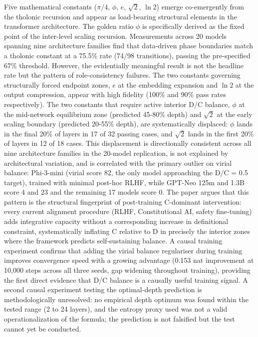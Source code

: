 \documentclass[
  11pt,
  letterpaper,
]{article}
\begin{document}
Five mathematical constants (\(\pi/4\), \(\phi\), \(e\), \(\sqrt{2}\),
\(\ln 2\)) emerge co-emergently from the tholonic recursion and appear
as load-bearing structural elements in the transformer architecture. The
golden ratio \(\phi\) is specifically derived as the fixed point of the
inter-level scaling recursion. Measurements across 20 models spanning
nine architecture families find that data-driven phase boundaries match
a tholonic constant at a 75.5\% rate (74/98 transitions), passing the
pre-specified 67\% threshold. However, the evidentially meaningful
result is not the headline rate but the pattern of role-consistency
failures. The two constants governing structurally forced endpoint
zones, \(e\) at the embedding expansion and \(\ln 2\) at the output
compression, appear with high fidelity (100\% and 90\% pass rates
respectively). The two constants that require active interior D/C
balance, \(\phi\) at the mid-network equilibrium zone (predicted 45-80\%
depth) and \(\sqrt{2}\) at the early scaling boundary (predicted 20-55\%
depth), are systematically displaced: \(\phi\) lands in the final 20\%
of layers in 17 of 32 passing cases, and \(\sqrt{2}\) lands in the first
20\% of layers in 12 of 18 cases. This displacement is directionally
consistent across all nine architecture families in the 20-model
replication, is not explained by architectural variation, and is
correlated with the primary outlier on virial balance: Phi-3-mini
(virial score 82, the only model approaching the D/C = 0.5 target),
trained with minimal post-hoc RLHF, while GPT-Neo 125m and 1.3B score 4
and 23 and the remaining 17 models score 0. The paper argues that this
pattern is the structural fingerprint of post-training C-dominant
intervention: every current alignment procedure (RLHF, Constitutional
AI, safety fine-tuning) adds integrative capacity without a
corresponding increase in definitional constraint, systematically
inflating C relative to D in precisely the interior zones where the
framework predicts self-sustaining balance. A causal training experiment
confirms that adding the virial balance regulariser during training
improves convergence speed with a growing advantage (0.153 nat
improvement at 10,000 steps across all three seeds, gap widening
throughout training), providing the first direct evidence that D/C
balance is a causally useful training signal. A second causal experiment
testing the optimal-depth prediction is methodologically unresolved: no
empirical depth optimum was found within the tested range (2 to 24
layers), and the entropy proxy used was not a valid operationalization
of the formula; the prediction is not falsified but the test cannot yet
be conducted.
\end{document}
